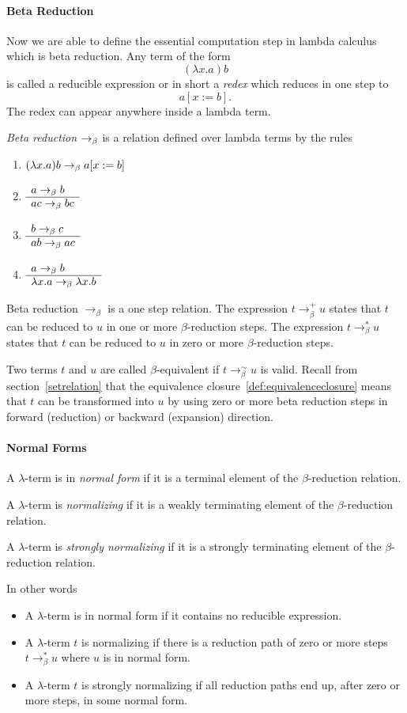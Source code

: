 \paragraph{Beta Reduction}

Now we are able to define the essential computation step in lambda calculus
which is beta reduction. Any term of the form
$$ (\lambda x.a) b$$ is called a reducible expression or in short a
\emph{redex} which reduces in one step to
$$a[x:=b].$$ The redex can appear anywhere inside a lambda term.

\begin{definition} \emph{Beta reduction} $\to_\beta$ is a relation defined over lambda
  terms by the rules
  \begin{enumerate}
  \item $(\lambda x.a) b \to_\beta a[x := b]$
  \item $\begin{array}{l} a\to_\beta b \\ \hline a c \to_\beta b c\end{array}$
  \item $\begin{array}{l} b\to_\beta c \\ \hline a b \to_\beta a c\end{array}$
  \item $\begin{array}{l} a \to_\beta b \\ \hline \lambda x.a \to_\beta \lambda x.b\end{array}$
  \end{enumerate}
\end{definition}

Beta reduction $\to_\beta$ is a one step relation. The expression
$t \to_\beta^+ u $ states that $t$ can be reduced to $u$ in one or more
$\beta$-reduction steps.  The expression $t \to_\beta^* u $ states that $t$
can be reduced to $u$ in zero or more $\beta$-reduction steps.

Two terms $t$ and $u$ are called $\beta$-equivalent if $t \to_\beta^\sim u$ is
valid. Recall from section~\ref{setrelation} that the equivalence
closure~\ref{def:equivalenceclosure} means that $t$ can be transformed into
$u$ by using zero or more beta reduction steps in forward (reduction) or
backward (expansion) direction.

\paragraph{Normal Forms}

\begin{definition}
  A $\lambda$-term is in \emph{normal form} if it is a terminal element of the
  $\beta$-reduction relation.

  A $\lambda$-term is \emph{normalizing} if it is a weakly terminating element of the
  $\beta$-reduction relation.

  A $\lambda$-term is \emph{strongly normalizing} if it is a strongly
  terminating element of the $\beta$-reduction relation.
\end{definition}
In other words
\begin{itemize}
\item A $\lambda$-term is in normal form if it contains no reducible expression.
\item A $\lambda$-term $t$ is normalizing if there is a reduction path of zero
  or more steps $t \to_\beta^* u$ where $u$ is in normal form.
\item A $\lambda$-term $t$ is strongly normalizing if all reduction
  paths end up, after zero or more steps, in some normal form.
\end{itemize}

